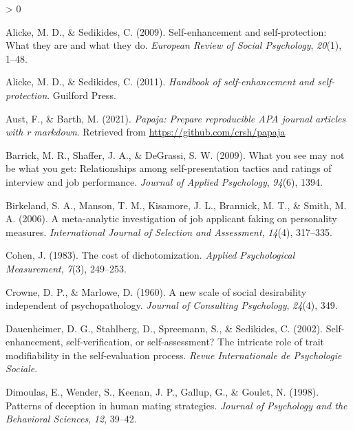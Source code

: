 \documentclass[
  english,
  ,jou]{apa6}
\newlength{\cslhangindent}
\newenvironment{CSLReferences}[2] %
 {%
  \setlength{\parindent}{0pt}
  \ifodd #1 \everypar{\setlength{\hangindent}{\cslhangindent}}\ignorespaces\fi
  \ifnum #2 > 0
  \setlength{\parskip}{#2\baselineskip}
  \fi
 }%
 {}
\begin{document}
\hypertarget{refs}{}
\begin{CSLReferences}{1}{0}
\leavevmode\hypertarget{ref-alicke_self-enhancement_2009}{}%
Alicke, M. D., \& Sedikides, C. (2009). Self-enhancement and self-protection: What they are and what they do. \emph{European Review of Social Psychology}, \emph{20}(1), 1--48.

\leavevmode\hypertarget{ref-alicke_handbook_2011}{}%
Alicke, M. D., \& Sedikides, C. (2011). \emph{Handbook of self-enhancement and self-protection}. Guilford Press.

\leavevmode\hypertarget{ref-R-papaja}{}%
Aust, F., \& Barth, M. (2021). \emph{Papaja: Prepare reproducible APA journal articles with r markdown}. Retrieved from \url{https://github.com/crsh/papaja}

\leavevmode\hypertarget{ref-barrick_what_2009}{}%
Barrick, M. R., Shaffer, J. A., \& DeGrassi, S. W. (2009). What you see may not be what you get: Relationships among self-presentation tactics and ratings of interview and job performance. \emph{Journal of Applied Psychology}, \emph{94}(6), 1394.

\leavevmode\hypertarget{ref-birkeland_meta-analytic_2006}{}%
Birkeland, S. A., Manson, T. M., Kisamore, J. L., Brannick, M. T., \& Smith, M. A. (2006). A meta-analytic investigation of job applicant faking on personality measures. \emph{International Journal of Selection and Assessment}, \emph{14}(4), 317--335.

\leavevmode\hypertarget{ref-cohen_cost_1983}{}%
Cohen, J. (1983). The cost of dichotomization. \emph{Applied Psychological Measurement}, \emph{7}(3), 249--253.

\leavevmode\hypertarget{ref-crowne_new_1960}{}%
Crowne, D. P., \& Marlowe, D. (1960). A new scale of social desirability independent of psychopathology. \emph{Journal of Consulting Psychology}, \emph{24}(4), 349.

\leavevmode\hypertarget{ref-dauenheimer_self-enhancement_2002}{}%
Dauenheimer, D. G., Stahlberg, D., Spreemann, S., \& Sedikides, C. (2002). Self-enhancement, self-verification, or self-assessment? The intricate role of trait modifiability in the self-evaluation process. \emph{Revue Internationale de Psychologie Sociale}.

\leavevmode\hypertarget{ref-dimoulas_patterns_1998}{}%
Dimoulas, E., Wender, S., Keenan, J. P., Gallup, G., \& Goulet, N. (1998). Patterns of deception in human mating strategies. \emph{Journal of Psychology and the Behavioral Sciences}, \emph{12}, 39--42.


\end{CSLReferences}
\end{document}
